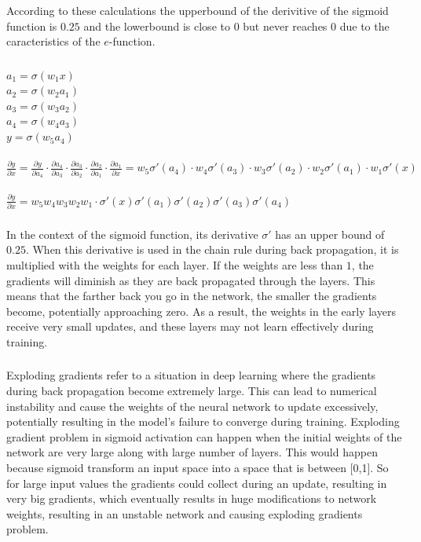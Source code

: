 \documentclass{article}
\begin{document}
According to these calculations the upperbound of the derivitive of the sigmoid function is $0.25$ and the lowerbound is close to $0$ but never reaches $0$ due to the caracteristics of the $e$-function.
\subsubsection{}
$a_{1} = \sigma(w_{1}x)$\\
$a_{2} = \sigma(w_{2}a_{1})$\\
$a_{3} = \sigma(w_{3}a_{2})$\\
$a_{4} = \sigma(w_{4}a_{3})$\\
$y = \sigma(w_{5}a_{4})$\\\\
$\frac{\partial y}{\partial x} = \frac{\partial y}{\partial a_{4}} \cdot \frac{\partial a_{4}}{\partial a_{3}} \cdot \frac{\partial a_{3}}{\partial a_{2}} \cdot \frac{\partial a_{2}}{\partial a_{1}} \cdot \frac{\partial a_{1}}{\partial x} = w_{5}\sigma'(a_{4}) \cdot w_{4}\sigma'(a_{3}) \cdot w_{3}\sigma'(a_{2}) \cdot w_{2}\sigma'(a_{1}) \cdot w_{1}\sigma'(x)$\\\\
$\frac{\partial y}{\partial x} = w_{5}w_{4}w_{3}w_{2}w_{1} \cdot \sigma'(x)\sigma'(a_{1})\sigma'(a_{2})\sigma'(a_{3})\sigma'(a_{4})$
\subsubsection{}
In the context of the sigmoid function, its derivative $\sigma'$ has an upper bound of $0.25$. When this derivative is used in the chain rule during back propagation, it is multiplied with the weights for each layer. If the weights are less than $1$, the gradients will diminish as they are back propagated through the layers. This means that the farther back you go in the network, the smaller the gradients become, potentially approaching zero. As a result, the weights in the early layers receive very small updates, and these layers may not learn effectively during training.
\subsubsection{}
Exploding gradients refer to a situation in deep learning where the gradients during back propagation become extremely large. This can lead to numerical instability and cause the weights of the neural network to update excessively, potentially resulting in the model's failure to converge during training. 
Exploding gradient problem in sigmoid activation can happen when the initial weights of the network are very large along with large number of layers. This would happen because sigmoid transform an input space into a space that is between [0,1]. So for large input values the gradients could collect during an update, resulting in very big gradients, which eventually results in huge modifications to network weights, resulting in an unstable network and causing exploding gradients problem.
\end{document}
